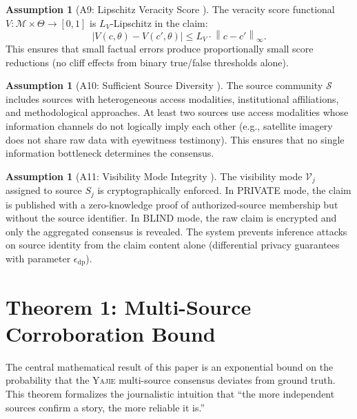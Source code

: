 \documentclass[11pt,a4paper]{article}
\theoremstyle{definition}
\newtheorem{assumption}[theorem]{Assumption}
\newcommand{\Yajie}{\textsc{Yajie}}
\newcommand{\norm}[1]{\left\lVert#1\right\rVert}
\newcommand{\abs}[1]{\left|#1\right|}
\newcommand{\claimSpace}{\mathcal{M}}
\newcommand{\sourceSet}{\mathcal{S}}
\newcommand{\newsState}{\Theta}
\newcommand{\VISprivate}{\textsc{PRIVATE}}
\newcommand{\VISblind}{\textsc{BLIND}}
\begin{document}
\begin{assumption}[A9: Lipschitz Veracity Score ]
\label{ass:A9}
The veracity score functional $V: \claimSpace \times \newsState \to [0, 1]$ is $L_V$-Lipschitz in the claim:
\begin{equation}
    \abs{V(c, \theta) - V(c', \theta)} \leq L_V \cdot \norm{c - c'}_\infty.
    \label{eq:lipschitz_veracity}
\end{equation}
This ensures that small factual errors produce proportionally small score reductions (no cliff effects from binary true/false thresholds alone).
\end{assumption}

\begin{assumption}[A10: Sufficient Source Diversity ]
\label{ass:A10}
The source community $\sourceSet$ includes sources with heterogeneous access modalities, institutional affiliations, and methodological approaches. At least two sources use access modalities whose information channels do not logically imply each other (e.g., satellite imagery does not share raw data with eyewitness testimony). This ensures that no single information bottleneck determines the consensus.
\end{assumption}

\begin{assumption}[A11: Visibility Mode Integrity ]
\label{ass:A11}
The visibility mode $\mathcal{V}_j$ assigned to source $S_j$ is cryptographically enforced. In \VISprivate{} mode, the claim is published with a zero-knowledge proof of authorized-source membership but without the source identifier. In \VISblind{} mode, the raw claim is encrypted and only the aggregated consensus is revealed. The system prevents inference attacks on source identity from the claim content alone (differential privacy guarantees with parameter $\epsilon_{\mathrm{dp}}$).
\end{assumption}

\section{Theorem 1: Multi-Source Corroboration Bound }
\label{sec:corroboration}

The central mathematical result of this paper is an exponential bound on the probability that the \Yajie{} multi-source consensus deviates from ground truth. This theorem formalizes the journalistic intuition that ``the more independent sources confirm a story, the more reliable it is.''
\end{document}
